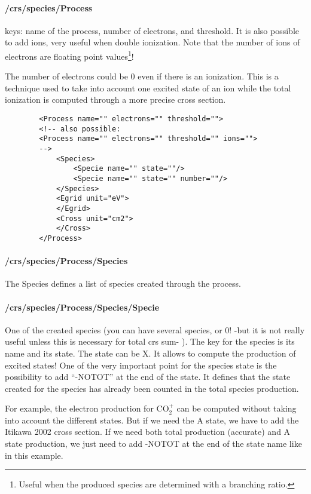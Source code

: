 \paragraph{/crs/species/Process}
keys: name of the process, number of electrons, and threshold.
It is also possible to add ions, very useful when double ionization. Note that the number of ions of electrons are floating point values\footnote{Useful when the produced species are determined with a branching ratio.}!

The number of electrons could be 0 even if there is an ionization. This is a technique used to take into account one excited state of an ion while the total ionization is computed through a more precise cross section.


\begin{verbatim}
		<Process name="" electrons="" threshold="">
		<!-- also possible:
		<Process name="" electrons="" threshold="" ions="">
		-->
			<Species>
				<Specie name="" state=""/>
				<Specie name="" state="" number=""/>
			</Species>
			<Egrid unit="eV">
			</Egrid>
			<Cross unit="cm2">
			</Cross>
		</Process>
\end{verbatim}

\paragraph{/crs/species/Process/Species}
The Species defines a list of species created through the process.
\paragraph{/crs/species/Process/Species/Specie}
One of the created species (you can have several species, or 0! -but it is not really useful unless this is necessary for total crs sum- ).
The key for the species is its name and its state. The state can be X. It allows to compute the production of excited states!
One of the very important point for the species state is the possibility to add ``-NOTOT'' at the end of the state.
 It defines that the state created for the species has already been counted in the total species production.

 For example, the electron production for CO$_2^+$ can be computed without taking into account the different states. But if we need the A state, we have to add the Itikawa 2002 cross section. If we need both total production (accurate) and A state production, we just need to add -NOTOT at the end of the state name like in this example. 

